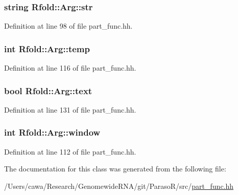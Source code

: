 \hypertarget{class_rfold_1_1_arg_a10258eb45eb764844e49e5587e187af7}{
\subsubsection[{str}]{\setlength{\rightskip}{0pt plus 5cm}string Rfold\+::\+Arg\+::str}}\label{class_rfold_1_1_arg_a10258eb45eb764844e49e5587e187af7}


Definition at line 98 of file part\+\_\+func.\+hh.

\hypertarget{class_rfold_1_1_arg_a25e15defa3a3a80e6a0593989ea9e44a}{
\subsubsection[{temp}]{\setlength{\rightskip}{0pt plus 5cm}int Rfold\+::\+Arg\+::temp}}\label{class_rfold_1_1_arg_a25e15defa3a3a80e6a0593989ea9e44a}


Definition at line 116 of file part\+\_\+func.\+hh.

\hypertarget{class_rfold_1_1_arg_ad174f7be713784b338a8e3423c950dac}{
\subsubsection[{text}]{\setlength{\rightskip}{0pt plus 5cm}bool Rfold\+::\+Arg\+::text}}\label{class_rfold_1_1_arg_ad174f7be713784b338a8e3423c950dac}


Definition at line 131 of file part\+\_\+func.\+hh.

\hypertarget{class_rfold_1_1_arg_abf6954c2deff613f191b1fae248389f3}{
\subsubsection[{window}]{\setlength{\rightskip}{0pt plus 5cm}int Rfold\+::\+Arg\+::window}}\label{class_rfold_1_1_arg_abf6954c2deff613f191b1fae248389f3}


Definition at line 112 of file part\+\_\+func.\+hh.



The documentation for this class was generated from the following file\+:\begin{DoxyCompactItemize}
\item 
/\+Users/cawa/\+Research/\+Genomewide\+R\+N\+A/git/\+Paraso\+R/src/\hyperlink{part__func_8hh}{part\+\_\+func.\+hh}\end{DoxyCompactItemize}
